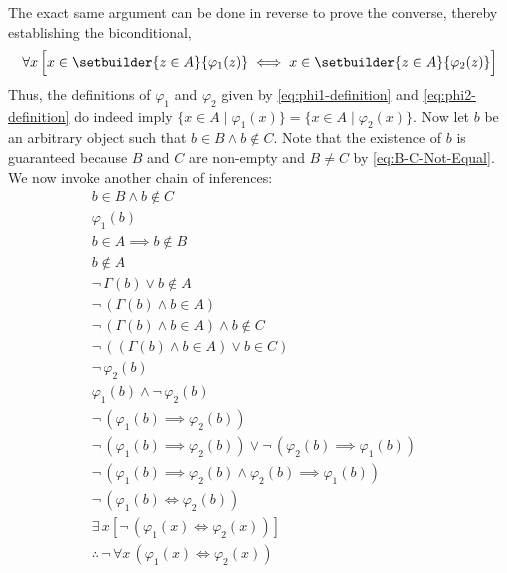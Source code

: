 \begin{rem}
    The exact same argument can be done in reverse to prove the converse, thereby
    establishing the biconditional,
    \begin{equation*}
        \forall x \, \Big[ x \in \setbuilder{z \in A}{\varphi_{1}(z)}
        \iff x \in \setbuilder{z \in A}{\varphi_{2}(z)} \Big]
    \end{equation*}
    Thus, the definitions of \( \varphi_{1} \) and \( \varphi_{2} \) given by
    \eqref{eq:phi1-definition} and \eqref{eq:phi2-definition} do indeed imply
    \( \{ x \in A \mid \varphi_{1}(x) \} = \{ x \in A \mid \varphi_{2}(x) \} \).
    Now let \( b \) be an arbitrary object such that \( b \in B \land b \notin C \).
    Note that the existence of \( b \) is guaranteed because \( B \) and \( C \) are
    non-empty and \( B \neq C \) by \eqref{eq:B-C-Not-Equal}. We now invoke another
    chain of inferences:
    \begin{equation*}
        \begin{aligned}
            b \in B \land b \notin C& \\
            \varphi_{1}(b)& \\
            b \in A \implies b \notin B& \\
            b \notin A& \\
            \lnot \, \Gamma(b) \lor b \notin A& \\
            \lnot \, ( \Gamma(b) \land b \in A )& \\
            \lnot \, ( \Gamma(b) \land b \in A ) \land b \notin C& \\
            \lnot \, ( ( \Gamma(b) \land b \in A ) \lor b \in C )& \\
            \lnot \, \varphi_{2}(b)& \\
            \varphi_{1}(b) \land \lnot \, \varphi_{2}(b)& \\
            \lnot \, ( \varphi_{1}(b) \implies \varphi_{2}(b) )& \\
            \lnot \, ( \varphi_{1}(b) \implies \varphi_{2}(b) )
            \lor \lnot \, ( \varphi_{2}(b) \implies \varphi_{1}(b) )& \\
            \lnot \, ( \varphi_{1}(b) \implies \varphi_{2}(b)
            \land \varphi_{2}(b) \implies \varphi_{1}(b) )& \\
            \lnot \, ( \varphi_{1}(b) \iff \varphi_{2}(b) )& \\
            \exists \, x [ \lnot \, ( \varphi_{1}(x) \iff \varphi_{2}(x) ) ]& \\
            \therefore \, \lnot \, \forall x \, ( \varphi_{1}(x) \iff \varphi_{2}(x) )&

\end{aligned}
\end{equation*}
\end{rem}
